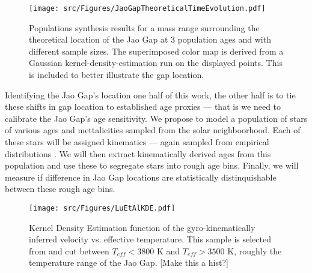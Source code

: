 \begin{figure}
	\centering
	\texttt{[image: src/Figures/JaoGapTheoreticalTimeEvolution.pdf]}
	\caption{Populations synthesis results for a mass range surrounding the
	theoretical location of the Jao Gap at 3 population ages and with different
	sample sizes. The superimposed color map is derived from a Gaussian
	kernel-density-estimation run on the displayed points. This is included to
	better illustrate the gap location.}
	\label{fig:JGTTE}
\end{figure}

Identifying the Jao Gap's location one half of this work, the other half is to
tie these shifts in gap location to established age proxies --- that is we need
to calibrate the Jao Gap's age sensitivity. We propose to model a population of
stars of various ages and mettalicities sampled from the solar neighboorhood.
Each of these stars will be assigned kinematics --- again sampled from
empirical distributions \citep[Figure \ref{fig:LuKde},][]{Lu2021}. We will then
extract kinematically derived ages from this population and use these to
segregate stars into rough age bins. Finally, we will measure if difference in
Jao Gap locations are statistically distinquishable between these rough age
bins.

\begin{figure}
	\centering
	\texttt{[image: src/Figures/LuEtAlKDE.pdf]}
	\caption{Kernel Density Estimation function of the gyro-kinematically
	inferred velocity vs. effective temperature. This sample is selected from
	\citet{Lu2021} and cut between $T_{eff} < 3800$ K and $T_{eff} > 3500$ K,
	roughly the temperature range of the Jao Gap. {\color{red}[Make this a hist?]}}
	\label{fig:LuKde}
\end{figure}
